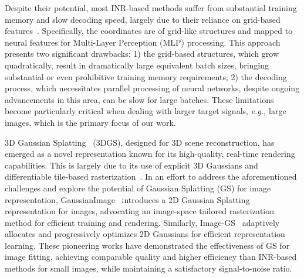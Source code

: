 Despite their potential, most INR-based methods suffer from substantial training memory and slow decoding speed, largely due to their reliance on grid-based features~\cite{sitzmann2020implicit, saragadam2023wire, ramasinghe2022beyond, liu2024finer}. Specifically, the coordinates are of grid-like structures and mapped to neural features for Multi-Layer Perception (MLP) processing. This approach presents two significant drawbacks: 1) the grid-based structures, which grow quadratically, result in dramatically large equivalent batch sizes, bringing substantial or even prohibitive training memory requirements; 2) the decoding process, which necessitates parallel processing of neural networks, despite ongoing advancements in this area, can be slow for large batches. These limitations become particularly critical when dealing with larger target signals, \textit{e.g.,} large images, which is the primary focus of our work. 

3D Gaussian Splatting~\cite{kerbl20233d} (3DGS), designed for 3D scene reconstruction, has emerged as a novel representation known for its high-quality, real-time rendering capabilities. This is largely due to its use of explicit 3D Gaussians and differentiable tile-based rasterization~\cite{lassner2021pulsar}. In an effort to address the aforementioned challenges and explore the potential of Gaussian Splatting (GS) for image representation, GaussianImage~\cite{zhang2024gaussianimage} introduces a 2D Gaussian Splatting representation for images, advocating an image-space tailored rasterization method for efficient training and rendering. Similarly, Image-GS~\cite{zhang2024image} adaptively allocates and progressively optimizes 2D Gaussians for efficient representation learning. These pioneering works have demonstrated the effectiveness of GS for image fitting, achieving comparable quality and higher efficiency than INR-based methods for small images, while maintaining a satisfactory signal-to-noise ratio.


